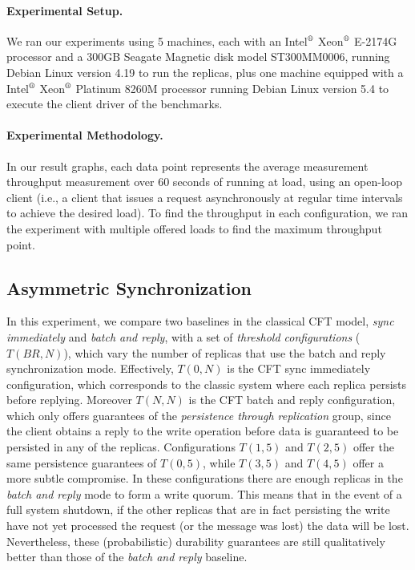 \paragraph{Experimental Setup.}
We ran our experiments using 5 machines, each with an
Intel$^\text{\textregistered}$ Xeon$^\text{\textregistered}$
E-2174G processor and a 300GB Seagate Magnetic disk model
ST300MM0006, running Debian Linux version 4.19 to run the
replicas, plus one machine equipped with a
Intel$^\text{\textregistered}$ Xeon$^\text{\textregistered}$
Platinum 8260M processor running Debian Linux version 5.4 to
execute the client driver of the benchmarks.

\paragraph{Experimental Methodology.} In our result graphs, each data point represents the average
measurement throughput measurement over $60$ seconds of running
at load, using an open-loop client (i.e., a client that issues a
request asynchronously at regular time intervals to achieve the
desired load). To find the throughput in each configuration, we
ran the experiment with multiple offered loads to find the
maximum throughput point.


\subsection{Asymmetric
Synchronization}\label{ssec:r2s2_eval_asym}

In this experiment, we compare two baselines in the classical
\ac{CFT} model, \emph{sync immediately} and \emph{batch and reply}, with a set of \emph{threshold
configurations} ($T(BR, N)$), which vary the number of replicas that use the
batch and reply synchronization mode. Effectively, $T(0, N)$ is
the \ac{CFT} sync immediately configuration, which corresponds to
the classic system where each replica persists before replying.
Moreover $T(N, N)$ is the \ac{CFT} batch and reply configuration,
which only offers guarantees of the \emph{persistence through
replication} group, since the client obtains a reply to the write
operation before data is guaranteed to be persisted in any of the
replicas. Configurations $T(1, 5)$ and $T(2, 5)$ offer the same
persistence guarantees of $T(0, 5)$, while $T(3, 5)$ and $T(4,
5)$ offer a more subtle compromise. In these configurations there are enough replicas in the \emph{batch and reply} mode
to form a write quorum. This means that in the
event of a full system shutdown, if the other replicas that are in
fact persisting the write have not yet processed the request (or
the message was lost) the data will be lost. Nevertheless, these
(probabilistic) durability guarantees are still qualitatively
better than those of the \emph{batch and reply} baseline.

